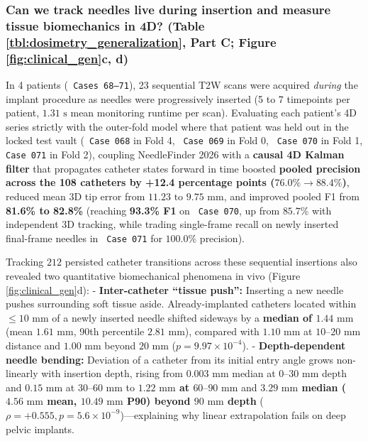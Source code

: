 \documentclass[
  11pt,
]{article}
\let\nforigtexttt\texttt
\renewcommand{\texttt}[1]{\nforigtexttt{\XeTeXinterchartokenstate=1 #1}}
\begin{document}
\subsubsection{\texorpdfstring{Can we track needles live during
insertion and measure tissue biomechanics in 4D? (Table
\ref{tbl:dosimetry_generalization}, Part C; Figure
\ref{fig:clinical_gen}c,
d)}{Can we track needles live during insertion and measure tissue biomechanics in 4D? (Table , Part C; Figure c, d)}}\label{can-we-track-needles-live-during-insertion-and-measure-tissue-biomechanics-in-4d-table-part-c-figure-c-d}

In 4 patients (\texttt{Cases\ 68–71}), 23 sequential T2W scans were
acquired \emph{during} the implant procedure as needles were
progressively inserted (5 to 7 timepoints per patient, \(1.31\text{ s}\)
mean monitoring runtime per scan). Evaluating each patient's 4D series
strictly with the outer-fold model where that patient was held out in
the locked test vault (\texttt{Case\ 068} in Fold 4, \texttt{Case\ 069}
in Fold 0, \texttt{Case\ 070} in Fold 1, \texttt{Case\ 071} in Fold 2),
coupling NeedleFinder 2026 with a \textbf{causal 4D Kalman filter} that
propagates catheter states forward in time boosted \textbf{pooled
precision across the 108 catheters by +12.4 percentage points
(\(76.0\% \to 88.4\%\))}, reduced mean 3D tip error from
\(11.23\text{ to }9.75\text{ mm}\), and improved pooled F1 from
\textbf{81.6\% to 82.8\%} (reaching \textbf{93.3\% F1} on
\texttt{Case\ 070}, up from \(85.7\%\) with independent 3D tracking,
while trading single-frame recall on newly inserted final-frame needles
in \texttt{Case\ 071} for \(100.0\%\) precision).

Tracking \(212\) persisted catheter transitions across these sequential
insertions also revealed two quantitative biomechanical phenomena in
vivo (Figure \ref{fig:clinical_gen}d): - \textbf{Inter-catheter ``tissue
push'':} Inserting a new needle pushes surrounding soft tissue aside.
Already-implanted catheters located within \(\le 10\text{ mm}\) of a
newly inserted needle shifted sideways by a \textbf{median of
\(1.44\text{ mm}\)} (mean \(1.61\text{ mm}\), 90th percentile
\(2.81\text{ mm}\)), compared with \textbf{\(1.10\text{ mm}\)} at
\(10\text{--}20\text{ mm}\) distance and \textbf{\(1.00\text{ mm}\)}
beyond \(20\text{ mm}\) (\(p = 9.97 \times 10^{-4}\)). -
\textbf{Depth-dependent needle bending:} Deviation of a catheter from
its initial entry angle grows non-linearly with insertion depth, rising
from \(0.003\text{ mm}\) median at \(0\text{--}30\text{ mm}\) depth and
\(0.15\text{ mm}\) at \(30\text{--}60\text{ mm}\) to
\textbf{\(1.22\text{ mm}\) at \(60\text{--}90\text{ mm}\)} and
\textbf{\(3.29\text{ mm}\) median (\(4.56\text{ mm}\) mean,
\(10.49\text{ mm}\) P90) beyond \(90\text{ mm}\) depth}
(\(\rho = +0.555, p = 5.6 \times 10^{-9}\))---explaining why linear
extrapolation fails on deep pelvic implants.
\end{document}
